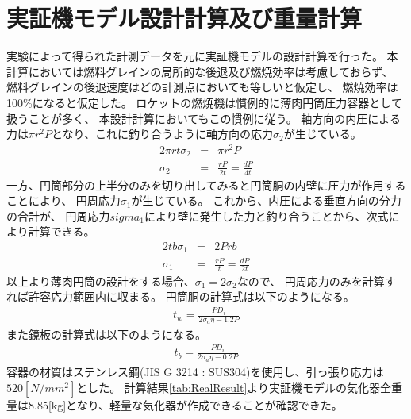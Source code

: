 \section{実証機モデル設計計算及び重量計算}
実験によって得られた計測データを元に実証機モデルの設計計算を行った。
本計算においては燃料グレインの局所的な後退及び燃焼効率は考慮しておらず、
燃料グレインの後退速度はどの計測点においても等しいと仮定し、
燃焼効率は100\%になると仮定した。
ロケットの燃焼機は慣例的に薄肉円筒圧力容器として扱うことが多く、
本設計計算においてもこの慣例に従う。
軸方向の内圧による力は$\pi r^2 P$となり、これに釣り合うように軸方向の応力$\sigma_2$が生じている。
\begin{eqnarray}
2\pi r t \sigma_2 &=& \pi r^2 P \\
\sigma_2 &=& \frac{rP}{2t}=\frac{dP}{4t}
\end{eqnarray}
一方、円筒部分の上半分のみを切り出してみると円筒胴の内壁に圧力が作用することにより、
円周応力$\sigma_1$が生じている。
これから、内圧による垂直方向の分力の合計が、
円周応力$sigma_1$により壁に発生した力と釣り合うことから、次式により計算できる。
\begin{eqnarray}
2tb\sigma_1 &=& 2Prb \\
\sigma_1 &=& \frac{rP}{t}= \frac{dP}{2t}
\end{eqnarray}
以上より薄肉円筒の設計をする場合、$\sigma_1=2\sigma_2$なので、
円周応力のみを計算すれば許容応力範囲内に収まる。
円筒胴の計算式は以下のようになる。
\begin{eqnarray}
t_w = \frac{PD_i}{2\sigma_a \eta - 1.2P}
\end{eqnarray}
また鏡板の計算式は以下のようになる。
\begin{eqnarray}
t_b = \frac{PD_i}{2\sigma_a \eta - 0.2P}
\end{eqnarray}
容器の材質はステンレス鋼(JIS G 3214 : SUS304)を使用し、引っ張り応力は$520[N/mm^2]$とした。
計算結果\ref{tab:RealResult}より実証機モデルの気化器全重量は8.85[kg]となり、軽量な気化器が作成できることが確認できた。





